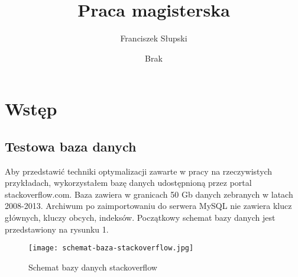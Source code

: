 \documentclass[12pt]{article}
\title{Praca magisterska}
\author{Franciszek Słupski}
\date{Brak}
\begin{document}
\maketitle

\tableofcontents
\section{Wstęp}

\subsection{Testowa baza danych}
Aby przedstawić techniki optymalizacji zawarte w pracy na rzeczywistych przykładach, wykorzystałem bazę danych udostępnioną przez portal stackoverflow.com. Baza zawiera w granicach 50 Gb danych zebranych w latach 2008-2013. Archiwum po zaimportowaniu do serwera MySQL nie zawiera klucz głównych, kluczy obcych, indeksów.
Początkowy schemat bazy danych jest przedstawiony na rysunku 1.
\begin{figure}
    \texttt{[image: schemat-baza-stackoverflow.jpg]} 
    \caption{Schemat bazy danych stackoverflow}
\end{figure}










\end{document}
